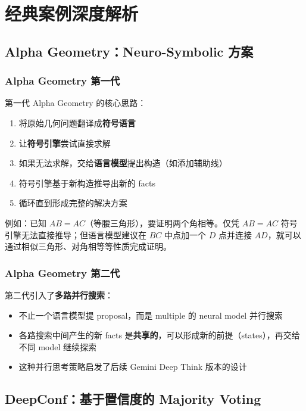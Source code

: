 \section{经典案例深度解析}

\subsection{Alpha Geometry：Neuro-Symbolic 方案}

\subsubsection{Alpha Geometry 第一代}

第一代 Alpha Geometry 的核心思路：
\begin{enumerate}
    \item 将原始几何问题翻译成\textbf{符号语言}
    \item 让\textbf{符号引擎}尝试直接求解
    \item 如果无法求解，交给\textbf{语言模型}提出构造（如添加辅助线）
    \item 符号引擎基于新构造推导出新的 facts
    \item 循环直到形成完整的解决方案
\end{enumerate}

例如：已知 $AB = AC$（等腰三角形），要证明两个角相等。仅凭 $AB = AC$ 符号引擎无法直接推导；但语言模型建议在 $BC$ 中点加一个 $D$ 点并连接 $AD$，就可以通过相似三角形、对角相等等性质完成证明。

\subsubsection{Alpha Geometry 第二代}

第二代引入了\textbf{多路并行搜索}：
\begin{itemize}
    \item 不止一个语言模型提 proposal，而是 multiple 的 neural model 并行搜索
    \item 各路搜索中间产生的新 facts 是\textbf{共享的}，可以形成新的前提（states），再交给不同 model 继续探索
    \item 这种并行思考策略启发了后续 Gemini Deep Think 版本的设计
\end{itemize}

\subsection{DeepConf：基于置信度的 Majority Voting}

